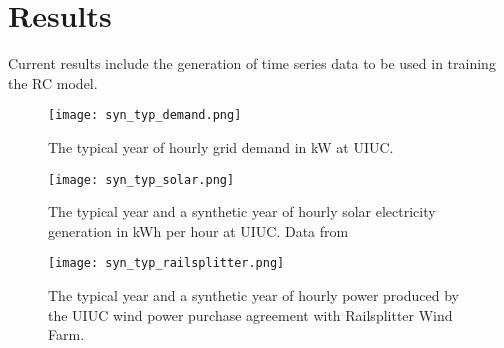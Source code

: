 \section{Results}

Current results include the generation of time series data to be used in
training the RC model.

\begin{figure}[h]
 	\centering
 	\label{fig:grid-demand}
 	\texttt{[image: syn\_typ\_demand.png]}
 	\caption{The typical year of hourly grid demand in kW at UIUC.}
\end{figure}
\begin{figure}[h]
	\centering
	\label{fig:steam-demand}
	\texttt{[image: syn\_typ\_solar.png]}
	\caption{The typical year and a synthetic year of hourly solar electricity
  generation in kWh per hour at UIUC. Data from
  \cite{alsoenergy_university_2019}}
\end{figure}
\begin{figure}[h]
	\centering
	\label{fig:solar-power}
	\texttt{[image: syn\_typ\_railsplitter.png]}
	\caption{The typical year and a synthetic year of hourly power produced by
  the UIUC wind power purchase agreement with Railsplitter Wind Farm.}
\end{figure}

